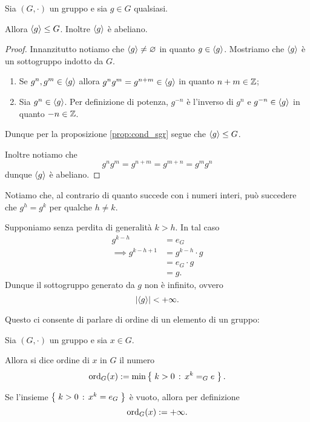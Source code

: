 \begin{proposition}
     \label{prop:sgr_generato_è_sgr}
    Sia $(G, \cdot)$ un gruppo e sia $g \in G$ qualsiasi.

    Allora $\cycl{g} \leq G$. Inoltre $\cycl{g}$ è abeliano.
\end{proposition}
\begin{proof}
    Innanzitutto notiamo che $\cycl{g} \neq \varnothing$ in quanto $g \in \cycl{g}$. Mostriamo che $\cycl{g}$ è un sottogruppo indotto da $G$.

    \begin{enumerate}[label={(\roman*)}]
        \item Se $g^n, g^m \in \cycl{g}$ allora $g^ng^m = g^{n+m} \in \cycl{g}$ in quanto $n+m \in \Z$;
        \item Sia $g^n \in \cycl{g}$. Per definizione di potenza, $g^{-n}$ è l'inverso di $g^n$ e $g^{-n} \in \cycl{g}$ in quanto $-n \in \Z$. 
    \end{enumerate}

    Dunque per la proposizione \ref{prop:cond_sgr} segue che $\cycl{g} \leq G$.

    Inoltre notiamo che \[
        g^ng^m = g^{n+m} = g^{m+n} = g^mg^n    
    \] dunque $\cycl{g}$ è abeliano.
\end{proof}

Notiamo che, al contrario di quanto succede con i numeri interi, può succedere che $g^h = g^k$ per qualche $h \neq k$.

Supponiamo senza perdita di generalità $k > h$. In tal caso \begin{align*}
    g^{k-h} &= e_G\\
    \implies g^{k-h+1} &= g^{k-h} \cdot g\\
    &= e_G \cdot g\\
    &= g.
\end{align*}
Dunque il sottogruppo generato da $g$ non è infinito, ovvero \[
    \abs*{\cycl*{g}} < +\infty.    
\]

Questo ci consente di parlare di ordine di un elemento di un gruppo:

\begin{definition}
     \label{def:ord_grp}
    Sia $(G, \cdot)$ un gruppo e sia $x \in G$.

    Allora si dice ordine di $x$ in $G$ il numero \[
        \ord[G]{x} \deq \min\set{k > 0 \suchthat x^k = _Ge}.    
    \]

    Se l'insieme $\set{k > 0 \suchthat x^k = e_G}$ è vuoto, allora per definizione \[
        \ord[G]{x} \deq +\infty.
    \]
\end{definition}


